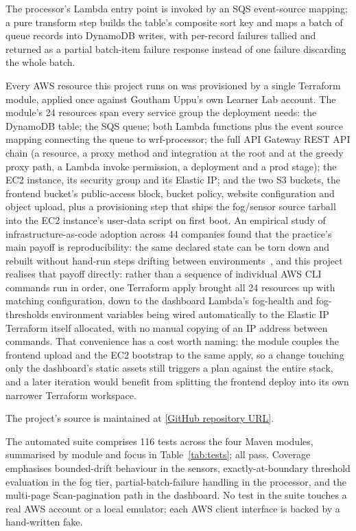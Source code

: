 \documentclass[conference]{IEEEtran}
\begin{document}
The processor's Lambda entry point is invoked by an SQS event-source mapping; a pure transform step builds the table's composite sort key and maps a batch of queue records into DynamoDB writes, with per-record failures tallied and returned as a partial batch-item failure response instead of one failure discarding the whole batch.

Every AWS resource this project runs on was provisioned by a single Terraform module, applied once against Goutham Uppu's own Learner Lab account. The module's 24 resources span every service group the deployment needs: the DynamoDB table; the SQS queue; both Lambda functions plus the event source mapping connecting the queue to wrf-processor; the full API Gateway REST API chain (a resource, a proxy method and integration at the root and at the greedy proxy path, a Lambda invoke permission, a deployment and a prod stage); the EC2 instance, its security group and its Elastic IP; and the two S3 buckets, the frontend bucket's public-access block, bucket policy, website configuration and object upload, plus a provisioning step that ships the fog/sensor source tarball into the EC2 instance's user-data script on first boot. An empirical study of infrastructure-as-code adoption across 44 companies found that the practice's main payoff is reproducibility: the same declared state can be torn down and rebuilt without hand-run steps drifting between environments~\cite{ref8}, and this project realises that payoff directly: rather than a sequence of individual AWS CLI commands run in order, one Terraform apply brought all 24 resources up with matching configuration, down to the dashboard Lambda's fog-health and fog-thresholds environment variables being wired automatically to the Elastic IP Terraform itself allocated, with no manual copying of an IP address between commands. That convenience has a cost worth naming: the module couples the frontend upload and the EC2 bootstrap to the same apply, so a change touching only the dashboard's static assets still triggers a plan against the entire stack, and a later iteration would benefit from splitting the frontend deploy into its own narrower Terraform workspace.

The project's source is maintained at \href{[GitHub repository URL]}{[GitHub repository URL]}.

The automated suite comprises 116 tests across the four Maven modules, summarised by module and focus in Table~\ref{tab:tests}; all pass. Coverage emphasises bounded-drift behaviour in the sensors, exactly-at-boundary threshold evaluation in the fog tier, partial-batch-failure handling in the processor, and the multi-page Scan-pagination path in the dashboard. No test in the suite touches a real AWS account or a local emulator; each AWS client interface is backed by a hand-written fake.
\end{document}
